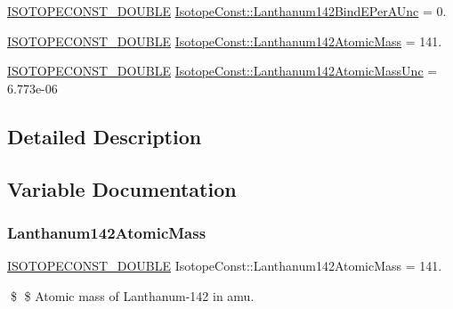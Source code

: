 \begin{DoxyCompactItemize}
\mbox{\hyperlink{group___isotope_const-_macros_ga8f45a7272ce02c0b4c65c44636ed719a}{I\+S\+O\+T\+O\+P\+E\+C\+O\+N\+S\+T\+\_\+\+D\+O\+U\+B\+LE}} \mbox{\hyperlink{group___isotope_const-_lanthanum-_la142_gaac72fb1bbe6c0ebf09f1eba825ffe382}{Isotope\+Const\+::\+Lanthanum142\+Bind\+E\+Per\+A\+Unc}} = 0.
\item 
\mbox{\hyperlink{group___isotope_const-_macros_ga8f45a7272ce02c0b4c65c44636ed719a}{I\+S\+O\+T\+O\+P\+E\+C\+O\+N\+S\+T\+\_\+\+D\+O\+U\+B\+LE}} \mbox{\hyperlink{group___isotope_const-_lanthanum-_la142_gab84f6a4d6530876896c8052dcc68526e}{Isotope\+Const\+::\+Lanthanum142\+Atomic\+Mass}} = 141.
\item 
\mbox{\hyperlink{group___isotope_const-_macros_ga8f45a7272ce02c0b4c65c44636ed719a}{I\+S\+O\+T\+O\+P\+E\+C\+O\+N\+S\+T\+\_\+\+D\+O\+U\+B\+LE}} \mbox{\hyperlink{group___isotope_const-_lanthanum-_la142_ga88621cc8fea110815ffb0b99a3e36af1}{Isotope\+Const\+::\+Lanthanum142\+Atomic\+Mass\+Unc}} = 6.\+773e-\/06
\end{DoxyCompactItemize}


\subsection{Detailed Description}


\subsection{Variable Documentation}
\mbox{\label{group___isotope_const-_lanthanum-_la142_gab84f6a4d6530876896c8052dcc68526e}} 
\subsubsection{\texorpdfstring{Lanthanum142\+Atomic\+Mass}{Lanthanum142AtomicMass}}
{\footnotesize\ttfamily \mbox{\hyperlink{group___isotope_const-_macros_ga8f45a7272ce02c0b4c65c44636ed719a}{I\+S\+O\+T\+O\+P\+E\+C\+O\+N\+S\+T\+\_\+\+D\+O\+U\+B\+LE}} Isotope\+Const\+::\+Lanthanum142\+Atomic\+Mass = 141.}

\$ \$ Atomic mass of Lanthanum-\/142 in amu. \mbox{\label{group___isotope_const-_lanthanum-_la142_ga88621cc8fea110815ffb0b99a3e36af1}} 
